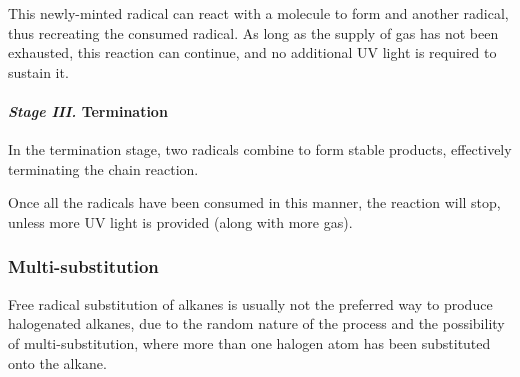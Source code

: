 					This newly-minted  radical can react with a  molecule to form  and another
					\ch{\chlorine} radical, thus recreating the consumed radical. As long as the supply of  gas has
					not been exhausted, this reaction can continue, and no additional UV light is required to sustain it.


				\pagebreak
				\paragraph{\textit{Stage III.}\hspace{5mm} Termination}

					In the termination stage, two radicals combine to form stable products, effectively terminating the chain reaction.


					Once all the radicals have been consumed in this manner, the reaction will stop, unless more UV light is provided (along
					with more  gas).




			\subsubsection{Multi-substitution}

				Free radical substitution of alkanes is usually not the preferred way to produce
				halogenated alkanes, due to the random nature of the process and the possibility of multi-substitution,
				where more than one halogen atom has been substituted onto the alkane.

